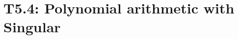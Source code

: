 \documentclass{beamer}
\begin{document}

\section{T5.4: Polynomial arithmetic with Singular}
\end{document}
